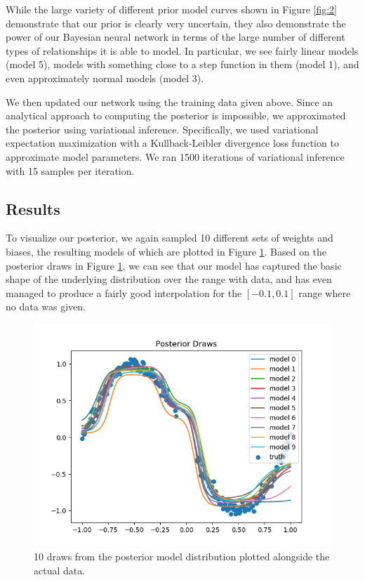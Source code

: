 \documentclass[
    preprint,
    12pt,
    letterpaper,
    longbibliography,
    nofootinbib,
    amsmath,
    amssymb,
    amsfonts,
]{revtex4-1}
\begin{document}
\newpage

While the large variety of different prior model curves shown in Figure \ref{fig:2} demonstrate that our prior is clearly very uncertain, they also demonstrate the power of our Bayesian neural network in terms of the large number of different types of relationships it is able to model. In particular, we see fairly linear models (model 5), models with something close to a step function in them (model 1), and even approximately normal models (model 3).

We then updated our network using the training data given above. Since an analytical approach to computing the posterior is impossible, we approximated the posterior using variational inference. Specifically, we used variational expectation maximization with a Kullback-Leibler divergence loss function to approximate model parameters.\cite{klpq} We ran 1500 iterations of variational inference with 15 samples per iteration.

\newpage

\subsection{Results}

To visualize our posterior, we again sampled 10 different sets of weights and biases, the resulting models of which are plotted in Figure \ref{fig:3}. Based on the posterior draws in Figure \ref{fig:3}, we can see that our model has captured the basic shape of the underlying distribution over the range with data, and has even managed to produce a fairly good interpolation for the $[-0.1, 0.1]$ range where no data was given.

\begin{figure}
\includegraphics{Figure_3.png}
\caption{10 draws from the posterior model distribution plotted alongside the actual data.}
\label{fig:3}
\end{figure}
\end{document}
